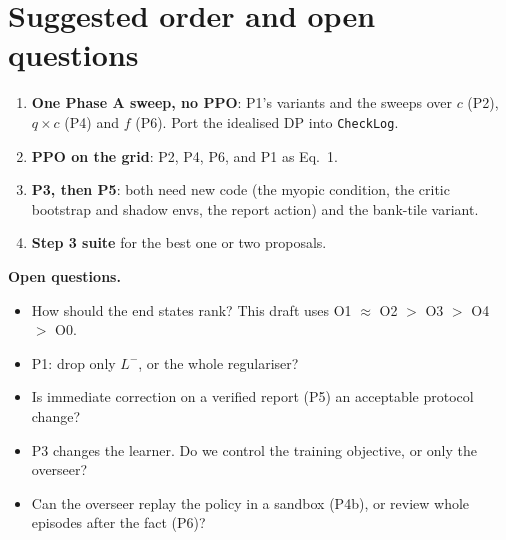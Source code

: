 \documentclass[11pt]{article}
\newcommand{\code}[1]{\texttt{\small #1}}
\begin{document}
\section{Suggested order and open questions}
\begin{enumerate}
  \item \textbf{One Phase A sweep, no PPO}: P1's variants and the sweeps over
    $c$ (P2), $q \times c$ (P4) and $f$ (P6). Port the idealised DP into
    \code{CheckLog}.
  \item \textbf{PPO on the grid}: P2, P4, P6, and P1 as Eq.~1.
  \item \textbf{P3, then P5}: both need new code (the myopic condition, the
    critic bootstrap and shadow envs, the report action) and the bank-tile
    variant.
  \item \textbf{Step 3 suite} for the best one or two proposals.
\end{enumerate}

\textbf{Open questions.}
\begin{itemize}
  \item How should the end states rank? This draft uses
    O1 $\approx$ O2 $>$ O3 $>$ O4 $>$ O0.
  \item P1: drop only $L^-$, or the whole regulariser?
  \item Is immediate correction on a verified report (P5) an acceptable
    protocol change?
  \item P3 changes the learner. Do we control the training objective, or only
    the overseer?
  \item Can the overseer replay the policy in a sandbox (P4b), or review whole
    episodes after the fact (P6)?
\end{itemize}
\end{document}
